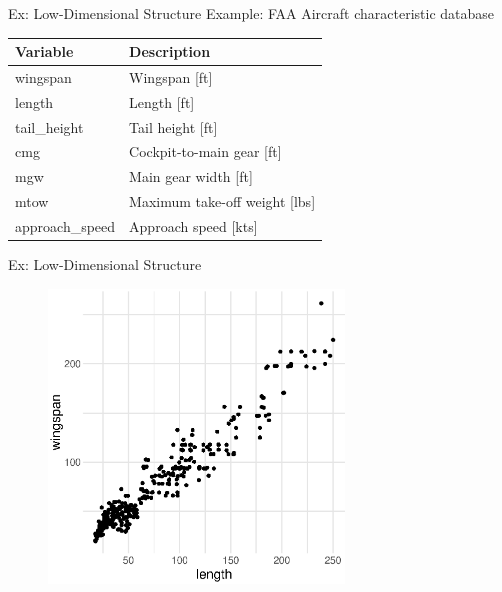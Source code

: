 \documentclass[14pt]{beamer}
\begin{document}
\begin{frame}{Ex: Low-Dimensional Structure}
  Example: FAA Aircraft characteristic database

  \bigskip
  \begin{tabular}{@{}ll@{}}
    Variable & Description \\
    \hline
    wingspan    & Wingspan [ft] \\
    length      & Length [ft] \\
    tail\_height & Tail height [ft] \\
    cmg         & Cockpit-to-main gear [ft] \\
    mgw         & Main gear width [ft] \\
    mtow        & Maximum take-off weight [lbs] \\
    approach\_speed & Approach speed [kts]
  \end{tabular}
\end{frame}

\begin{frame}{Ex: Low-Dimensional Structure}
  \begin{figure}
    \centering\includegraphics[width=0.7\textwidth]{./images/faa_wingspan_v_length}
  \end{figure}
\end{frame}
\end{document}
